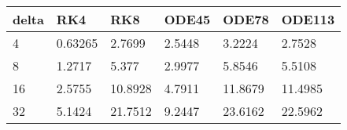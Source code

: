 \begin{tabular}{llllll}
delta & RK4 & RK8 & ODE45 & ODE78 & ODE113 \\ 
\hline 
4 & 0.63265 & 2.7699 & 2.5448 & 3.2224 & 2.7528 \\ 
8 & 1.2717 & 5.377 & 2.9977 & 5.8546 & 5.5108 \\ 
16 & 2.5755 & 10.8928 & 4.7911 & 11.8679 & 11.4985 \\ 
32 & 5.1424 & 21.7512 & 9.2447 & 23.6162 & 22.5962 \\ 
\hline 
\end{tabular}